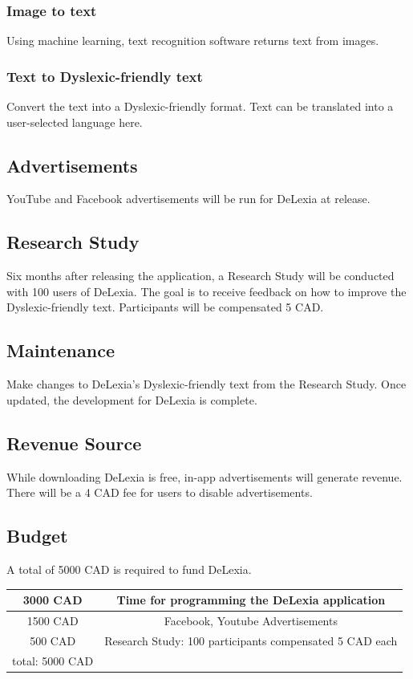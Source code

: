 \documentclass[a4paper]{article}
\begin{document}
\subsubsection{Image to text}
Using machine learning, text recognition software returns text from images.

\subsubsection{Text to Dyslexic-friendly text}
Convert the text into a Dyslexic-friendly format. Text can be translated into a user-selected language here. 

\subsection{Advertisements}
YouTube and Facebook advertisements will be run for DeLexia at release.

\subsection{Research Study}
Six months after releasing the application, a Research Study will be conducted with 100 users of DeLexia.
The goal is to receive feedback on how to improve the Dyslexic-friendly text. Participants will be compensated 5 CAD.

\subsection{Maintenance}
Make changes to DeLexia's Dyslexic-friendly text from the Research Study. 
Once updated, the development for DeLexia is complete.
 
\subsection{Revenue Source}

While downloading DeLexia is free, in-app advertisements will generate revenue.
There will be a 4 CAD fee for users to disable advertisements.


\subsection{Budget}

A total of 5000 CAD is required to fund DeLexia.

\begin{center}
\begin{tabular}{ |c|c| } 
 \hline
 	3000 CAD & Time for programming the DeLexia application \\
     \hline
    1500 CAD & Facebook, Youtube Advertisements\\
     \hline
    500 CAD & Research Study: 100 participants compensated 5 CAD each\\
     \hline
    total: 5000 CAD \\
 \hline
\end{tabular}
\end{center}
\end{document}
